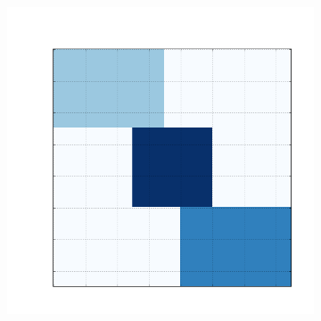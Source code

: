 \documentclass[10pt]{beamer}
\begin{document}
\begin{frame}
\begin{figure}[H]
\begin{subfigure}[b]{0.13\textwidth}
      \end{subfigure}
      \begin{subfigure}[b]{0.13\textwidth}
          \includegraphics[width=\textwidth]{img/d-reconstruction-binovnmtf.png}
      \end{subfigure}


\end{figure}
\end{frame}
\end{document}
